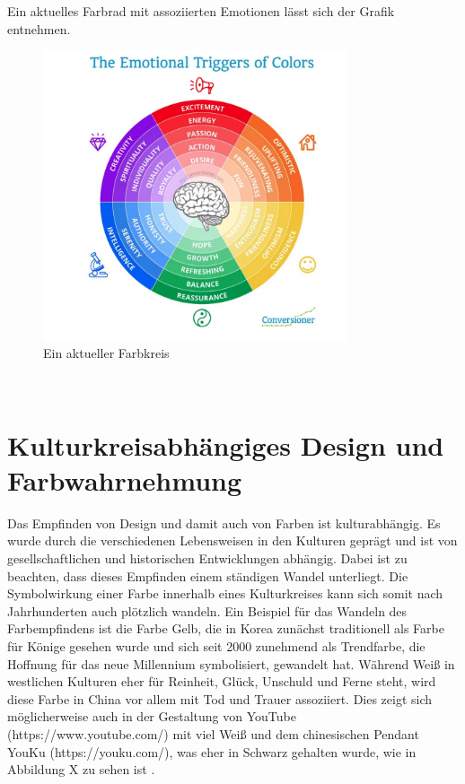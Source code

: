 \documentclass[./dokumentation.tex]{subfiles}
\begin{document}
Ein aktuelles Farbrad mit assoziierten Emotionen lässt sich der Grafik entnehmen. \\

\begin{figure}[h]
    \centering
    \includegraphics[width=0.8\textwidth]{bilder/farbkreis.png}
    \caption{Ein aktueller Farbkreis \cite{DesignEmo2003}}
    \label{fig9:farbkreis}
\end{figure}\\

\pagebreak

\section{Kulturkreisabhängiges Design und Farbwahrnehmung}
Das Empfinden von Design und damit auch von Farben ist kulturabhängig. Es wurde durch die verschiedenen Lebensweisen in den Kulturen geprägt und ist von gesellschaftlichen und historischen Entwicklungen abhängig. Dabei ist zu beachten, dass dieses Empfinden einem ständigen Wandel unterliegt. Die Symbolwirkung einer Farbe innerhalb eines Kulturkreises kann sich somit nach Jahrhunderten auch plötzlich wandeln. Ein Beispiel für das Wandeln des Farbempfindens ist die Farbe Gelb, die in Korea zunächst traditionell als Farbe für Könige gesehen wurde und sich seit 2000 zunehmend als Trendfarbe, die Hoffnung für das neue Millennium symbolisiert, gewandelt hat. Während Weiß in westlichen Kulturen eher für Reinheit, Glück, Unschuld und Ferne steht, wird diese Farbe in China vor allem mit Tod und Trauer assoziiert. Dies zeigt sich möglicherweise auch in der Gestaltung von YouTube (https://www.youtube.com/) mit viel Weiß und dem chinesischen Pendant YouKu (https://youku.com/), was eher in Schwarz gehalten wurde, wie in Abbildung X zu sehen ist \cite{Kunzer2016}.  \pagebreak
\end{document}
